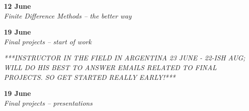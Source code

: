 \documentclass[10pt,a4paper]{amsart}
\begin{document}
\begin{minipage}{\linewidth}
\noindent \textbf{12 June}\\
\textit{Finite Difference Methods -- the better way}
\vspace{12pt}
\end{minipage}

\begin{minipage}{\linewidth}
\noindent \textbf{19 June}\\
\textit{Final projects -- start of work}
\vspace{12pt}
\end{minipage}

\noindent\emph{***INSTRUCTOR IN THE FIELD IN ARGENTINA 23 JUNE - 22-ISH AUG; WILL DO HIS BEST TO ANSWER EMAILS RELATED TO FINAL PROJECTS. SO GET STARTED REALLY EARLY!***}\\

\begin{minipage}{\linewidth}
\noindent \textbf{19 June}\\
\textit{Final projects -- presentations}
\vspace{12pt}
\end{minipage}
\end{document}
